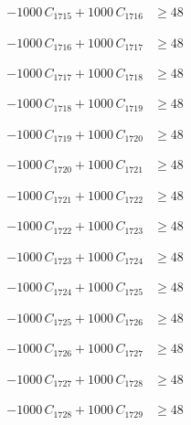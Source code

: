 \documentclass[a4paper,11pt]{article}
\begin{document}
\begin{align}
-1000\,C_{1715} + 1000\,C_{1716} &\geq 48 \nonumber
\end{align}

\begin{align}
-1000\,C_{1716} + 1000\,C_{1717} &\geq 48 \nonumber
\end{align}

\begin{align}
-1000\,C_{1717} + 1000\,C_{1718} &\geq 48 \nonumber
\end{align}

\begin{align}
-1000\,C_{1718} + 1000\,C_{1719} &\geq 48 \nonumber
\end{align}

\begin{align}
-1000\,C_{1719} + 1000\,C_{1720} &\geq 48 \nonumber
\end{align}

\begin{align}
-1000\,C_{1720} + 1000\,C_{1721} &\geq 48 \nonumber
\end{align}

\begin{align}
-1000\,C_{1721} + 1000\,C_{1722} &\geq 48 \nonumber
\end{align}

\begin{align}
-1000\,C_{1722} + 1000\,C_{1723} &\geq 48 \nonumber
\end{align}

\begin{align}
-1000\,C_{1723} + 1000\,C_{1724} &\geq 48 \nonumber
\end{align}

\begin{align}
-1000\,C_{1724} + 1000\,C_{1725} &\geq 48 \nonumber
\end{align}

\begin{align}
-1000\,C_{1725} + 1000\,C_{1726} &\geq 48 \nonumber
\end{align}

\begin{align}
-1000\,C_{1726} + 1000\,C_{1727} &\geq 48 \nonumber
\end{align}

\begin{align}
-1000\,C_{1727} + 1000\,C_{1728} &\geq 48 \nonumber
\end{align}

\begin{align}
-1000\,C_{1728} + 1000\,C_{1729} &\geq 48 \nonumber
\end{align}
\end{document}
